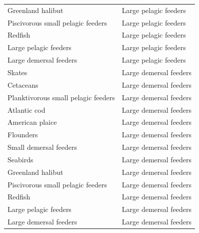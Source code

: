 \begin{singlespace}
\begin{longtable}{ p{} p{} }
    Greenland halibut                   & Large pelagic feeders \\
    Piscivorous small pelagic feeders   & Large pelagic feeders \\
    Redfish                             & Large pelagic feeders \\
    Large pelagic feeders               & Large pelagic feeders \\
    Large demersal feeders              & Large pelagic feeders \\
    Skates                              & Large demersal feeders    \\
    Cetaceans                           & Large demersal feeders    \\
    Planktivorous small pelagic feeders & Large demersal feeders    \\
    Atlantic cod                        & Large demersal feeders    \\
    American plaice                     & Large demersal feeders    \\
    Flounders                           & Large demersal feeders    \\
    Small demersal feeders              & Large demersal feeders    \\
    Seabirds                            & Large demersal feeders    \\
    Greenland halibut                   & Large demersal feeders    \\
    Piscivorous small pelagic feeders   & Large demersal feeders    \\
    Redfish                             & Large demersal feeders    \\
    Large pelagic feeders               & Large demersal feeders    \\
    Large demersal feeders              & Large demersal feeders    \\
    \bottomrule
  \end{longtable}

\end{singlespace}
